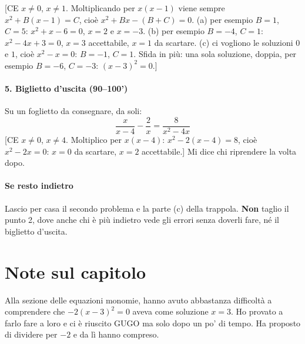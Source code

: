 \documentclass[11pt]{report}
\begin{document}
[CE $x\neq0$, $x\neq1$. Moltiplicando per $x(x-1)$ viene sempre $x^2+B(x-1)=C$, cioè $x^2+Bx-(B+C)=0$. (a) per esempio $B=1$, $C=5$: $x^2+x-6=0$, $x=2$ e $x=-3$. (b) per esempio $B=-4$, $C=1$: $x^2-4x+3=0$, $x=3$ accettabile, $x=1$ da scartare. (c) ci vogliono le soluzioni $0$ e $1$, cioè $x^2-x=0$: $B=-1$, $C=1$. Sfida in più: una sola soluzione, doppia, per esempio $B=-6$, $C=-3$: $(x-3)^2=0$.]

\paragraph{5. Biglietto d'uscita (90--100')}
Su un foglietto da consegnare, da soli:
$$
\frac{x}{x-4}-\frac{2}{x}=\frac{8}{x^2-4x}
$$
[CE $x\neq0$, $x\neq4$. Moltiplico per $x(x-4)$: $x^2-2(x-4)=8$, cioè $x^2-2x=0$: $x=0$ da scartare, $x=2$ accettabile.]
Mi dice chi riprendere la volta dopo.

\paragraph{Se resto indietro}
Lascio per casa il secondo problema e la parte (c) della trappola. \textbf{Non} taglio il punto 2, dove anche chi è più indietro vede gli errori senza doverli fare, né il biglietto d'uscita.

\section{Note sul capitolo}
Alla sezione delle equazioni monomie, hanno avuto abbastanza difficoltà a comprendere che $-2(x-3)^2=0$ aveva come soluzione $x=3$. Ho provato a farlo fare a loro e ci è riuscito GUGO ma solo dopo un po' di tempo. Ha proposto di dividere per $-2$ e da lì hanno compreso.
\end{document}
